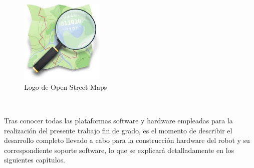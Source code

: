 \begin{figure} [h!]
	\begin{center}
		\includegraphics[width=4cm]{figs/osm.png}
	\end{center}
	\caption{Logo de Open Street Maps}  %
	\label{fig:osm}
\end{figure}\ 




Tras conocer todas las plataformas software y hardware empleadas para la realización del presente trabajo fin de grado, es el momento de describir el desarrollo completo llevado a cabo para la construcción hardware del robot  y su correspondiente soporte software, lo que se explicará detalladamente en los siguientes capítulos.

